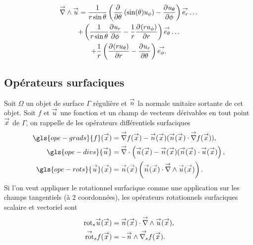     \begin{multline}
        \vrot \vu = \frac{1}{r\sin\theta}\left(\ddr{\theta}{}\left(\sin(\theta)u_\phi\right) - \ddr{\phi}{u_\theta}\right)\vect{e_r}\dots
        \\
        + \left(\frac{1}{r\sin\theta}\ddr{\phi}{u_r} - \frac{1}{r}\ddr{r}{(ru_\phi)} \right)\vect{e_\theta} \dots
        \\
        + \frac{1}{r}\left(\ddr{r}{(ru_\theta)}-\ddr{\theta}{u_r}\right)\vect{e_\phi.}
    \end{multline}

\subsection{Opérateurs surfaciques}

    Soit \(\Omega\) un objet de surface \(\Gamma\) régulière et \(\vn\) la normale unitaire sortante de cet objet.
    Soit \(f\) et \(\vu\) une fonction et un champ de vecteurs dérivables en tout point \(\vx\) de \(\Gamma\), on rappelle de \cite{nedelec_acoustic_2001} les opérateurs différentiels surfaciques
    \begin{align}
        \gls{ope-grads}{f}(\vx) &= \vgrad{f}(\vx) - \vn(\vx) (\vn(\vx) \cdot \vgrad{f}(\vx)),
        \\
        \gls{ope-divs}{\vu} &= \vdiv\left(\vu(\vx) - \vn(\vx) (\vn(\vx) \cdot \vu(\vx)\right),
        \\
        \gls{ope-rots}{\vu}(\vx) &= \vn(\vx)\left(\vn(\vx) \cdot \vrot{\vu}(\vx)\right).
    \end{align}
    Si l'on veut appliquer le rotationnel surfacique comme une application sur les champs tangentiels (à 2 coordonnées), les opérateurs rotationnels surfaciques scalaire et vectoriel sont
    \begin{align}
        \trots{\vu}(\vx) &= \vn(\vx) \cdot \vrot{\vu}(\vx),
        \\
        \tvrots{f}(\vx) &= - \vn \pvect \vgrads f(\vx).
    \end{align}